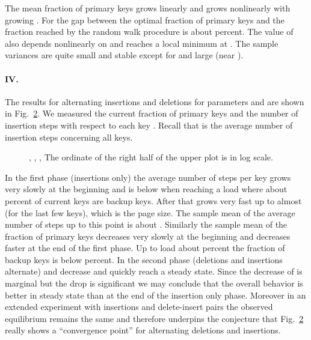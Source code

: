 \let\accentvec\vec \documentclass{llncs}
\newcommand{\figPath}{.}
\begin{document}
\begin{figure}[htb]
\centering
\subfigure{\scalebox{0.58}{}}
 \hspace{0.2cm}
\subfigure{\scalebox{0.58}{}}
 \hspace{0.2cm}
\subfigure{\scalebox{0.58}{}}
\caption{\label{fig:parameter_alpha} }
\end{figure}

The mean fraction of primary keys  grows linearly and  grows nonlinearly with growing .
For  the gap between the optimal fraction of primary keys and the fraction reached by the random walk procedure is about  percent. The value of  also depends nonlinearly on  and reaches a local minimum at . The sample variances are quite small and stable except for  and large  (near ).

\paragraph{IV.}
The results for alternating insertions and deletions for parameters  and  are shown in Fig.~\ref{fig:number_of_steps}. We measured the current fraction of primary keys  and the number of insertion steps with respect to each key . Recall that  is the average number of insertion steps concerning all keys.
\begin{figure}[ht]
\centering
{
\scalebox{0.7}{

}
\caption{\label{fig:number_of_steps}, , , The ordinate of the right half of the upper plot is in log scale.}
}
\end{figure}
In the first phase (insertions only) the average number of steps per key grows very slowly at the beginning and is below  when reaching a load where about  percent of current keys are backup keys.  After that  grows very fast up to almost  (for the last few keys), which is the page size.
The sample mean of the average number of steps  up to this point is about . Similarly the sample mean of the fraction of primary keys  decreases very slowly at the beginning and decreases faster at the end of the first phase.
Up to load about  percent the fraction of backup keys is below  percent. 
In the second phase (deletions and insertions alternate)  and  decrease and quickly reach a steady state. Since the decrease of  is marginal but the drop  is significant we may conclude that the overall behavior is better in steady state than at the end of the insertion only phase. Moreover in an extended experiment with  insertions and  delete-insert pairs the observed equilibrium remains the same and therefore underpins the conjecture that Fig.~\ref{fig:number_of_steps} really shows a ``convergence point'' for alternating deletions and insertions.
\end{document}
